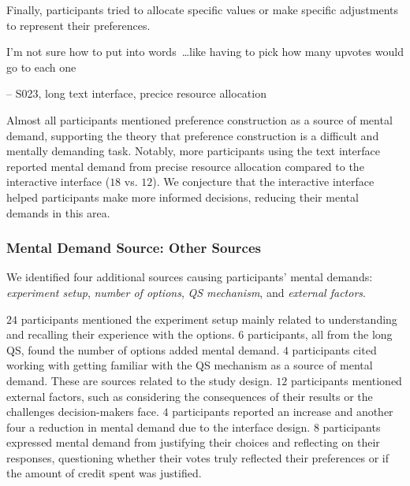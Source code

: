 
Finally, participants tried to allocate specific values or make specific 
adjustments to represent their preferences. 

\begin{displayquote}
I'm not sure how to put into words~\ldots like having to pick how many upvotes would go to each one
    
\noindent \hfill -- S023, long text interface, precice resource allocation
\end{displayquote}

Almost all participants mentioned preference construction as a source of mental demand, supporting the theory that preference construction is a difficult and mentally demanding task. Notably, more participants using the text interface reported mental demand from precise resource allocation compared to the interactive interface ($18$ vs. $12$). We conjecture that the interactive interface helped participants make more informed decisions, reducing their mental demands in this area.


\subsubsection{Mental Demand Source: Other Sources}
We identified four additional sources causing participants' mental demands: \textit{experiment setup}, \textit{number of options}, \textit{QS mechanism}, and \textit{external factors}. 

$24$ participants mentioned the experiment setup mainly related to understanding and recalling their experience with the options. $6$ participants, all from the long QS, found the number of options added mental demand. $4$ participants cited working with getting familiar with the QS mechanism as a source of mental demand. These are sources related to the study design. $12$ participants mentioned external factors, such as considering the consequences of their results or the challenges decision-makers face. $4$ participants reported an increase and another four a reduction in mental demand due to the interface design. $8$ participants expressed mental demand from justifying their choices and reflecting on their responses, questioning whether their votes truly reflected their preferences or if the amount of credit spent was justified.

